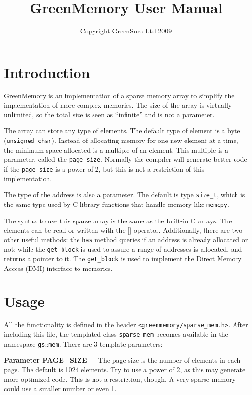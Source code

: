 \documentclass[12pt,oneside]{gsbook}
\author{Copyright GreenSocs Ltd 2009}
\title{GreenMemory User Manual}
\begin{document}
\maketitle
\tableofcontents



\chapter{Introduction}
\label{INTRO}

GreenMemory is an implementation of a sparse memory array to simplify
the implementation of more complex memories. The size of the array is
virtually unlimited, so the total size is seen as ``infinite'' and is
not a parameter.

The array can store any type of elements. The default type of element
is a byte (\texttt{unsigned char}). Instead of allocating memory for
one new element at a time, the minimum space allocated is a multiple
of an element. This multiple is a parameter, called the
\texttt{page\_size}. Normally the compiler will generate better code
if the \texttt{page\_size} is a power of 2, but this is not a
restriction of this implementation.

The type of the address is also a parameter. The default is type
\texttt{size\_t}, which is the same type used by C library functions
that handle memory like \texttt{memcpy}.

The syntax to use this sparse array is the same as the built-in C
arrays. The elements can be read or written with the []
operator. Additionally, there are two other useful methods: the
\texttt{has} method queries if an address is already allocated or not;
while the \texttt{get\_block} is used to assure a range of addresses
is allocated, and returns a pointer to it. The \texttt{get\_block} is
used to implement the Direct Memory Access (DMI) interface to
memories.


\chapter{Usage}
\label{USAGE}

All the functionality is defined in the header
\texttt{<greenmemory/sparse\_mem.h>}. After including this file, the
templated class \texttt{sparse\_mem} becomes available in the
namespace \texttt{gs}::\texttt{mem}. There are 3 template parameters:
\vspace{5pt}

\textbf{Parameter PAGE\_SIZE} --- The page size is the number of
elements in each page. The default is 1024 elements. Try to use a
power of 2, as this may generate more optimized code. This is not a
restriction, though. A very sparse memory could use a smaller number
or even 1.
\end{document}
